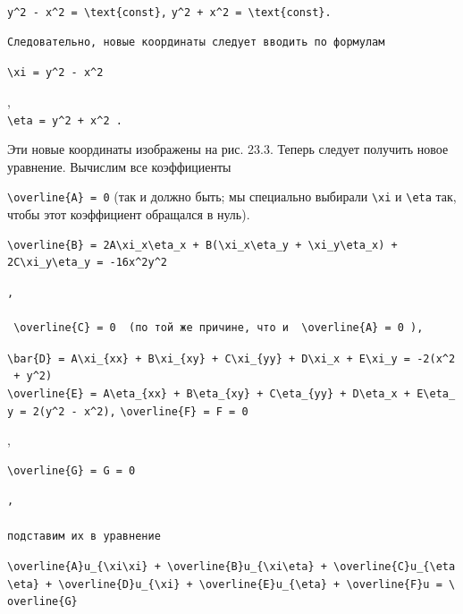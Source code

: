 \documentclass[
  ukrainian,
]{article}
\begin{document}
\texttt{y\^{}2\ -\ x\^{}2\ =\ \textbackslash{}text\{const\},}
\texttt{y\^{}2\ +\ x\^{}2\ =\ \textbackslash{}text\{const\}.}

\begin{verbatim}
Следовательно, новые координаты следует вводить по формулам
\end{verbatim}

\texttt{\textbackslash{}xi\ =\ y\^{}2\ -\ x\^{}2}

,\\
\texttt{\textquotesingle{}\textbackslash{}eta\ =\ y\^{}2\ +\ x\^{}2\textquotesingle{}\ .}

Эти новые координаты изображены на рис. 23.3. Теперь следует получить
новое уравнение. Вычислим все коэффициенты

\texttt{\textbackslash{}overline\{A\}\ =\ 0} (так и должно быть; мы
специально выбирали \texttt{\textbackslash{}xi} и
\texttt{\textbackslash{}eta} так, чтобы этот коэффициент обращался в
нуль).

\begin{verbatim}
\overline{B} = 2A\xi_x\eta_x + B(\xi_x\eta_y + \xi_y\eta_x) + 2C\xi_y\eta_y = -16x^2y^2
\end{verbatim}

\begin{verbatim}
,

 \overline{C} = 0  (по той же причине, что и  \overline{A} = 0 ),
\end{verbatim}

\texttt{\textbackslash{}bar\{D\}\ =\ A\textbackslash{}xi\_\{xx\}\ +\ B\textbackslash{}xi\_\{xy\}\ +\ C\textbackslash{}xi\_\{yy\}\ +\ D\textbackslash{}xi\_x\ +\ E\textbackslash{}xi\_y\ =\ -2(x\^{}2\ +\ y\^{}2)}
\texttt{\textbackslash{}overline\{E\}\ =\ A\textbackslash{}eta\_\{xx\}\ +\ B\textbackslash{}eta\_\{xy\}\ +\ C\textbackslash{}eta\_\{yy\}\ +\ D\textbackslash{}eta\_x\ +\ E\textbackslash{}eta\_y\ =\ 2(y\^{}2\ -\ x\^{}2),}
\texttt{\textbackslash{}overline\{F\}\ =\ F\ =\ 0}

,

\begin{verbatim}
\overline{G} = G = 0
\end{verbatim}

\begin{verbatim}
,

подставим их в уравнение
\end{verbatim}

\texttt{\textbackslash{}overline\{A\}u\_\{\textbackslash{}xi\textbackslash{}xi\}\ +\ \textbackslash{}overline\{B\}u\_\{\textbackslash{}xi\textbackslash{}eta\}\ +\ \textbackslash{}overline\{C\}u\_\{\textbackslash{}eta\textbackslash{}eta\}\ +\ \textbackslash{}overline\{D\}u\_\{\textbackslash{}xi\}\ +\ \textbackslash{}overline\{E\}u\_\{\textbackslash{}eta\}\ +\ \textbackslash{}overline\{F\}u\ =\ \textbackslash{}overline\{G\}}
\end{document}
